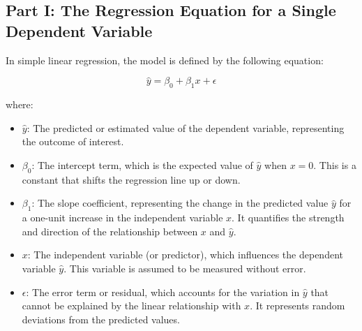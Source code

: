 \subsection{Part I: The Regression Equation for a Single Dependent Variable}

In simple linear regression, the model is defined by the following equation:

\begin{equation}
    \hat{y} = \beta_0 + \beta_1 x + \epsilon
\end{equation}

where:
\begin{itemize}
    \item \(\hat{y}\): The predicted or estimated value of the dependent variable, representing the outcome of interest.
    \item \(\beta_0\): The intercept term, which is the expected value of \(\hat{y}\) when \(x = 0\). This is a constant that shifts the regression line up or down.
    \item \(\beta_1\): The slope coefficient, representing the change in the predicted value \(\hat{y}\) for a one-unit increase in the independent variable \(x\). It quantifies the strength and direction of the relationship between \(x\) and \(\hat{y}\).
    \item \(x\): The independent variable (or predictor), which influences the dependent variable \(\hat{y}\). This variable is assumed to be measured without error.
    \item \(\epsilon\): The error term or residual, which accounts for the variation in \(\hat{y}\) that cannot be explained by the linear relationship with \(x\). It represents random deviations from the predicted values.
\end{itemize}
